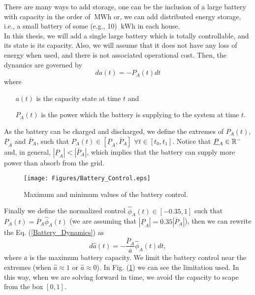 There are many ways to add storage, one can be the inclusion of a large battery with capacity in the order of $\SI{}{\mega\watt\hour}$ or, we can add distributed energy storage, i.e., a small battery of some (e.g., 10) $\SI{}{\kilo\watt\hour}$ in each house.\\
In this thesis, we will add a single large battery which is totally controllable, and its state is its capacity. Also, we will assume that it does not have any loss of energy when used, and there is not associated operational cost. Then, the dynamics are governed by
\begin{equation}
da(t)=-P_A(t)dt
\label{Battery_Dynamics}
\end{equation}
where
\begin{enumerate}

\item[$a(t)$] is the capacity state at time $t$ and

\item[$P_A(t)$] is the power which the battery is supplying to the system at time $t$.

\end{enumerate}
As the battery can be charged and discharged, we define the extremes of $P_A(t)$, $\underline{P}_A$ and $\overline{P}_A$, such that $P_A(t)\in[\underline{P}_A,\overline{P}_A]$ $\forall t\in[t_0,t_1]$. Notice that $\underline{P}_A\in\mathbb{R}^-$ and, in general, $|\underline{P}_A|<|\overline{P}_A|$, which implies that the battery can supply more power than absorb from the grid.\\
 \begin{figure}[H]
\centering
\texttt{[image: Figures/Battery\_Control.eps]}
\caption{Maximum and minimum values of the battery control.}
\label{Batt_Control}
\end{figure}
Finally we define the normalized control $\hat{\phi}_A(t)\in[-0.35,1]$ such that $P_A(t)=\overline{P}_A\hat{\phi}_A(t)$ (we are assuming that $|\underline{P}_A|=0.35|\overline{P}_A|$), then we can rewrite the Eq. (\ref{Battery_Dynamics}) as
\begin{equation}
d\hat{a}(t)=-\frac{\overline{P}_A}{\overline{a}}\hat{\phi}_A(t)dt,
\label{Dynamics_Battery}
\end{equation}
where $\overline{a}$ is the maximum battery capacity. We limit the battery control near the extremes (when $\hat{a}\approx1$ or $\hat{a}\approx0$). In Fig. (\ref{Batt_Control}) we can see the limitation used. In this way, when we are solving forward in time, we avoid the capacity to scape from the box $[0,1]$.\\
